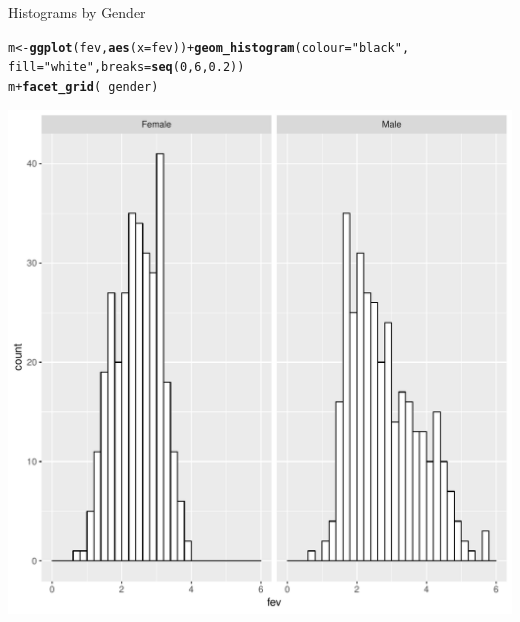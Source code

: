 \documentclass[10pt]{beamer}\usepackage[]{graphicx}\usepackage[]{color}
\makeatletter
\def\maxwidth{ %
  \ifdim\Gin@nat@width>\linewidth
    \linewidth
  \else
    \Gin@nat@width
  \fi
}
\newcommand{\hlnum}[1]{\textcolor[rgb]{0.686,0.059,0.569}{#1}}%
\newcommand{\hlstr}[1]{\textcolor[rgb]{0.192,0.494,0.8}{#1}}%
\newcommand{\hlopt}[1]{\textcolor[rgb]{0,0,0}{#1}}%
\newcommand{\hlstd}[1]{\textcolor[rgb]{0.345,0.345,0.345}{#1}}%
\newcommand{\hlkwb}[1]{\textcolor[rgb]{0.69,0.353,0.396}{#1}}%
\newcommand{\hlkwc}[1]{\textcolor[rgb]{0.333,0.667,0.333}{#1}}%
\newcommand{\hlkwd}[1]{\textcolor[rgb]{0.737,0.353,0.396}{\textbf{#1}}}%
\newenvironment{kframe}{%
 \def\at@end@of@kframe{}%
 \ifinner\ifhmode%
  \def\at@end@of@kframe{\end{minipage}}%
  \begin{minipage}{\columnwidth}%
 \fi\fi%
 \def\FrameCommand##1{\hskip\@totalleftmargin \hskip-\fboxsep
 \colorbox{shadecolor}{##1}\hskip-\fboxsep
     \hskip-\linewidth \hskip-\@totalleftmargin \hskip\columnwidth}%
 \MakeFramed {\advance\hsize-\width
   \@totalleftmargin\z@ \linewidth\hsize
   \@setminipage}}%
 {\par\unskip\endMakeFramed%
 \at@end@of@kframe}
\newenvironment{knitrout}{}{} %
\makeatother
\begin{document}
\begin{frame}[fragile]{Histograms by Gender}

\begin{knitrout}\footnotesize
{}\color{fgcolor}\begin{kframe}
\begin{alltt}
\hlstd{m} \hlkwb{<-} \hlkwd{ggplot}\hlstd{(fev,} \hlkwd{aes}\hlstd{(}\hlkwc{x} \hlstd{= fev))} \hlopt{+} \hlkwd{geom_histogram}\hlstd{(}\hlkwc{colour} \hlstd{=} \hlstr{"black"}\hlstd{,}
    \hlkwc{fill} \hlstd{=} \hlstr{"white"}\hlstd{,} \hlkwc{breaks} \hlstd{=} \hlkwd{seq}\hlstd{(}\hlnum{0}\hlstd{,} \hlnum{6}\hlstd{,} \hlnum{0.2}\hlstd{))}
\hlstd{m} \hlopt{+} \hlkwd{facet_grid}\hlstd{(}\hlopt{~}\hlstd{gender)}
\end{alltt}
\end{kframe}

{\centering \includegraphics[width=\maxwidth,height=.6\linewidth]{figure/unnamed-chunk-7-1} 

}



\end{knitrout}

\end{frame}
\end{document}
